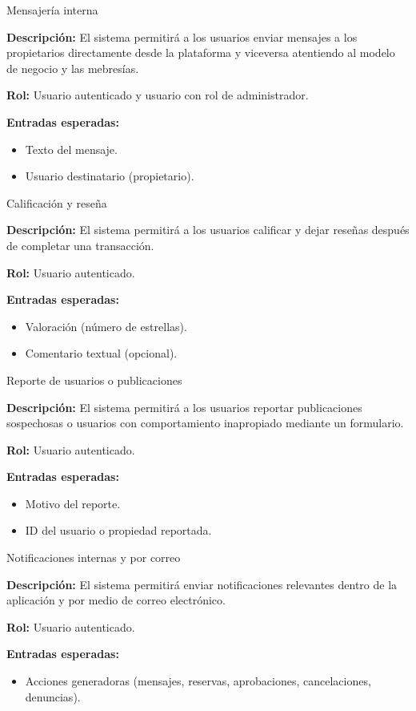 \begin{requisito}{Mensajería interna}
	\item \textbf{Descripción:} El sistema permitirá a los usuarios enviar mensajes a los propietarios directamente desde la plataforma y viceversa atentiendo al modelo de negocio y las mebresías.
	\item \textbf{Rol:} Usuario autenticado y usuario con rol de administrador.
	\item \textbf{Entradas esperadas:}
	\begin{itemize}
		\item Texto del mensaje.
		\item Usuario destinatario (propietario).
	\end{itemize}
\end{requisito}
\begin{requisito}{Calificación y reseña}
	\item \textbf{Descripción:} El sistema permitirá a los usuarios  calificar y dejar reseñas después de completar una transacción.
	\item \textbf{Rol:} Usuario autenticado.
	\item \textbf{Entradas esperadas:}
	\begin{itemize}
		\item Valoración (número de estrellas).
		\item Comentario textual (opcional).
	\end{itemize}
\end{requisito}
\begin{requisito}{Reporte de usuarios o publicaciones}
	\item \textbf{Descripción:} El sistema permitirá a los usuarios reportar publicaciones sospechosas o usuarios con comportamiento inapropiado mediante un formulario.
	\item \textbf{Rol:} Usuario autenticado.
	\item \textbf{Entradas esperadas:}
	\begin{itemize}
		\item Motivo del reporte.
		\item ID del usuario o propiedad reportada.
	\end{itemize}
\end{requisito}
\begin{requisito}{Notificaciones internas y por correo}
	\item \textbf{Descripción:} El sistema permitirá enviar notificaciones relevantes dentro de la aplicación y por medio de correo electrónico.
	\item \textbf{Rol:} Usuario autenticado.
	\item \textbf{Entradas esperadas:}
	\begin{itemize}
		\item Acciones generadoras (mensajes, reservas, aprobaciones, cancelaciones, denuncias).
	\end{itemize}
\end{requisito}
